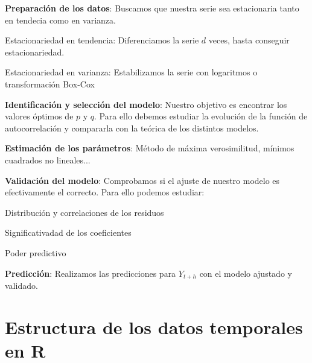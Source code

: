 \documentclass[10pt,a4paper,twoside]{beamer}
\begin{document}

\begin{frame}

\begin{itemize*}
\item \textbf{Preparación de los datos}: Buscamos que nuestra serie sea estacionaria tanto en tendecia como en varianza.
    \begin{itemize*}
    \item Estacionariedad en tendencia: Diferenciamos la serie $d$ veces, hasta conseguir estacionariedad.
    \item Estacionariedad en varianza: Estabilizamos la serie con logaritmos o transformación Box-Cox
    \end{itemize*}
\item \textbf{Identificación y selección del modelo}: Nuestro objetivo es encontrar los valores óptimos de $p$ y $q$. Para ello debemos estudiar la evolución de la función de autocorrelación y compararla con la teórica de los distintos modelos.
\item \textbf{Estimación de los parámetros}: Método de máxima verosimilitud, mínimos cuadrados no lineales...
\item \textbf{Validación del modelo}: Comprobamos si el ajuste de nuestro modelo es efectivamente el correcto. Para ello podemos estudiar:
    \begin{itemize*}
    \item Distribución y correlaciones de los residuos
    \item Significativadad de los coeficientes
    \item Poder predictivo
    \end{itemize*}
\item \textbf{Predicción}: Realizamos las predicciones para $Y_{t+h}$ con el modelo ajustado y validado.
\end{itemize*}

\end{frame}

\section{Estructura de los datos temporales en R}
\end{document}
